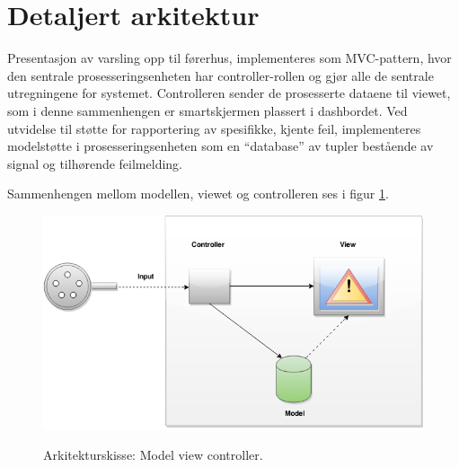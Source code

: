 \section{Detaljert arkitektur} %
\label{sec:arkitektur}
Presentasjon av varsling opp til førerhus, implementeres som MVC-pattern, 
hvor den sentrale prosesseringsenheten har controller-rollen og gjør alle 
de sentrale utregningene for systemet. Controlleren sender de prosesserte 
dataene til viewet, som i denne sammenhengen er smartskjermen plassert i 
dashbordet. Ved utvidelse til støtte for rapportering av spesifikke, 
kjente feil, implementeres modelstøtte i prosesseringsenheten som en 
``database'' av tupler bestående av signal og tilhørende feilmelding. 

Sammenhengen mellom modellen, viewet og controlleren ses i figur \ref{fig:mvc}.
\newline
\begin{figure}[H]
	\centering
	\includegraphics[width=1.00\textwidth]{images/architecture2-mvc.png}
	\label{fig:mvc}
	\caption{Arkitekturskisse: Model view controller.}
\end{figure}